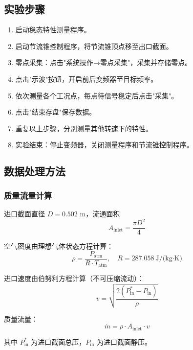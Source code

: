 \subsection{实验步骤}

\begin{enumerate}
    \item 启动稳态特性测量程序。
    \item 启动节流锥控制程序，将节流锥顶点移至出口截面。
    \item 零点采集：点击"系统操作→零点采集"，采集并存储零点。
    \item 点击"示波"按钮，开启前后变频器至目标频率。
    \item 依次测量各个工况点，每点待信号稳定后点击"采集"。
    \item 点击"结束存盘"保存数据。
    \item 重复以上步骤，分别测量其他转速下的特性。
    \item 实验结束：停止变频器，关闭测量程序和节流锥控制程序。
\end{enumerate}

\subsection{数据处理方法}

\subsubsection{质量流量计算}

进口截面直径 $D = 0.502$ m，流通面积
\begin{equation}
    A_{\text{inlet}} = \frac{\pi D^2}{4}
\end{equation}

空气密度由理想气体状态方程计算：
\begin{equation}
    \rho = \frac{P_{\text{atm}}}{R \cdot T_{\text{atm}}}, \quad R = 287.058\ \text{J/(kg·K)}
\end{equation}

进口速度由伯努利方程计算（不可压缩流动）：
\begin{equation}
    v = \sqrt{\frac{2(P_{\text{in}}^* - P_{\text{in}})}{\rho}}
\end{equation}

质量流量：
\begin{equation}
    \dot{m} = \rho \cdot A_{\text{inlet}} \cdot v
\end{equation}

其中 $P_{\text{in}}^*$ 为进口截面总压，$P_{\text{in}}$ 为进口截面静压。

